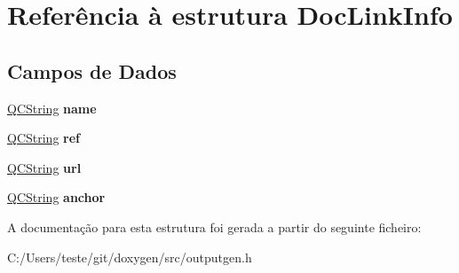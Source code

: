 \hypertarget{struct_doc_link_info}{\section{Referência à estrutura Doc\-Link\-Info}
\label{struct_doc_link_info}
}
\subsection*{Campos de Dados}
\begin{DoxyCompactItemize}
\item 
\hypertarget{struct_doc_link_info_adc0097c7bd1e61ad32058fcde425bc7a}{\hyperlink{class_q_c_string}{Q\-C\-String} {\bfseries name}}\label{struct_doc_link_info_adc0097c7bd1e61ad32058fcde425bc7a}

\item 
\hypertarget{struct_doc_link_info_a12b5232acab32ee40a197f72270d4ad1}{\hyperlink{class_q_c_string}{Q\-C\-String} {\bfseries ref}}\label{struct_doc_link_info_a12b5232acab32ee40a197f72270d4ad1}

\item 
\hypertarget{struct_doc_link_info_ae460a12583d5413f9b10d653d645416e}{\hyperlink{class_q_c_string}{Q\-C\-String} {\bfseries url}}\label{struct_doc_link_info_ae460a12583d5413f9b10d653d645416e}

\item 
\hypertarget{struct_doc_link_info_a77f4824b029885f469aa2903eabf92d4}{\hyperlink{class_q_c_string}{Q\-C\-String} {\bfseries anchor}}\label{struct_doc_link_info_a77f4824b029885f469aa2903eabf92d4}

\end{DoxyCompactItemize}


A documentação para esta estrutura foi gerada a partir do seguinte ficheiro\-:\begin{DoxyCompactItemize}
\item 
C\-:/\-Users/teste/git/doxygen/src/outputgen.\-h\end{DoxyCompactItemize}

